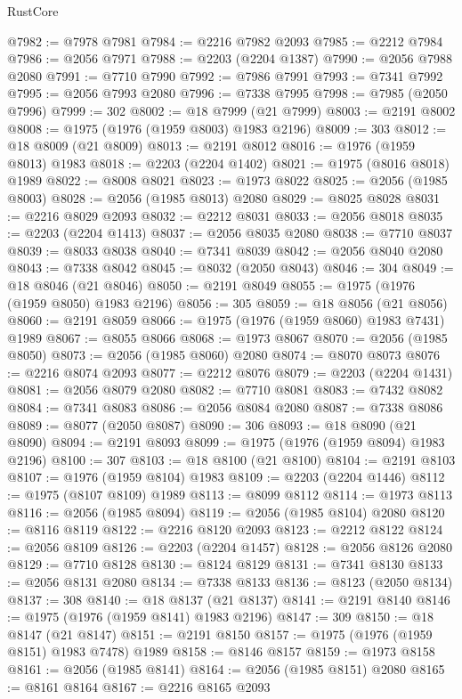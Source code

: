\begin{lexlean}{RustCore}
\begin{coremodule}
@7982 := @7978 @7981
@7984 := @2216 @7982 @2093
@7985 := @2212 @7984
@7986 := @2056 @7971
@7988 := @2203 (@2204 @1387)
@7990 := @2056 @7988 @2080
@7991 := @7710 @7990
@7992 := @7986 @7991
@7993 := @7341 @7992
@7995 := @2056 @7993 @2080
@7996 := @7338 @7995
@7998 := @7985 (@2050 @7996)
@7999 := 302
@8002 := @18 @7999 (@21 @7999)
@8003 := @2191 @8002
@8008 := @1975 (@1976 (@1959 @8003) @1983 @2196)
@8009 := 303
@8012 := @18 @8009 (@21 @8009)
@8013 := @2191 @8012
@8016 := @1976 (@1959 @8013) @1983
@8018 := @2203 (@2204 @1402)
@8021 := @1975 (@8016 @8018) @1989
@8022 := @8008 @8021
@8023 := @1973 @8022
@8025 := @2056 (@1985 @8003)
@8028 := @2056 (@1985 @8013) @2080
@8029 := @8025 @8028
@8031 := @2216 @8029 @2093
@8032 := @2212 @8031
@8033 := @2056 @8018
@8035 := @2203 (@2204 @1413)
@8037 := @2056 @8035 @2080
@8038 := @7710 @8037
@8039 := @8033 @8038
@8040 := @7341 @8039
@8042 := @2056 @8040 @2080
@8043 := @7338 @8042
@8045 := @8032 (@2050 @8043)
@8046 := 304
@8049 := @18 @8046 (@21 @8046)
@8050 := @2191 @8049
@8055 := @1975 (@1976 (@1959 @8050) @1983 @2196)
@8056 := 305
@8059 := @18 @8056 (@21 @8056)
@8060 := @2191 @8059
@8066 := @1975 (@1976 (@1959 @8060) @1983 @7431) @1989
@8067 := @8055 @8066
@8068 := @1973 @8067
@8070 := @2056 (@1985 @8050)
@8073 := @2056 (@1985 @8060) @2080
@8074 := @8070 @8073
@8076 := @2216 @8074 @2093
@8077 := @2212 @8076
@8079 := @2203 (@2204 @1431)
@8081 := @2056 @8079 @2080
@8082 := @7710 @8081
@8083 := @7432 @8082
@8084 := @7341 @8083
@8086 := @2056 @8084 @2080
@8087 := @7338 @8086
@8089 := @8077 (@2050 @8087)
@8090 := 306
@8093 := @18 @8090 (@21 @8090)
@8094 := @2191 @8093
@8099 := @1975 (@1976 (@1959 @8094) @1983 @2196)
@8100 := 307
@8103 := @18 @8100 (@21 @8100)
@8104 := @2191 @8103
@8107 := @1976 (@1959 @8104) @1983
@8109 := @2203 (@2204 @1446)
@8112 := @1975 (@8107 @8109) @1989
@8113 := @8099 @8112
@8114 := @1973 @8113
@8116 := @2056 (@1985 @8094)
@8119 := @2056 (@1985 @8104) @2080
@8120 := @8116 @8119
@8122 := @2216 @8120 @2093
@8123 := @2212 @8122
@8124 := @2056 @8109
@8126 := @2203 (@2204 @1457)
@8128 := @2056 @8126 @2080
@8129 := @7710 @8128
@8130 := @8124 @8129
@8131 := @7341 @8130
@8133 := @2056 @8131 @2080
@8134 := @7338 @8133
@8136 := @8123 (@2050 @8134)
@8137 := 308
@8140 := @18 @8137 (@21 @8137)
@8141 := @2191 @8140
@8146 := @1975 (@1976 (@1959 @8141) @1983 @2196)
@8147 := 309
@8150 := @18 @8147 (@21 @8147)
@8151 := @2191 @8150
@8157 := @1975 (@1976 (@1959 @8151) @1983 @7478) @1989
@8158 := @8146 @8157
@8159 := @1973 @8158
@8161 := @2056 (@1985 @8141)
@8164 := @2056 (@1985 @8151) @2080
@8165 := @8161 @8164
@8167 := @2216 @8165 @2093

\end{coremodule}
\end{lexlean}
